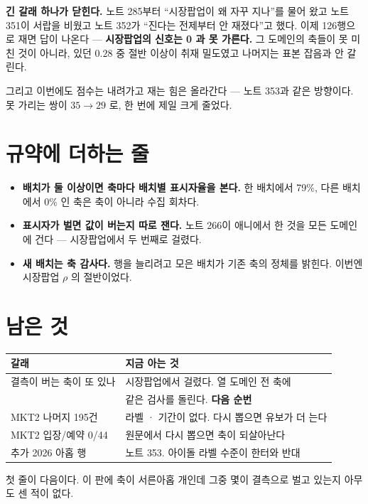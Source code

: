 \documentclass[11pt]{article}
\begin{document}
\textbf{긴 갈래 하나가 닫힌다.} 노트 285부터 ``시장팝업이 왜 자꾸 지나''를
물어 왔고 노트 351이 서랍을 비웠고 노트 352가 ``진다는 전제부터 안
재졌다''고 했다. 이제 126행으로 재면 답이 나온다 --- \textbf{시장팝업의
신호는 0 과 못 가른다.} 그 도메인의 축들이 못 미친 것이 아니라, 있던
$0.28$ 중 절반 이상이 취재 밀도였고 나머지는 표본 잡음과 안 갈린다.

그리고 이번에도 점수는 내려가고 재는 힘은 올라간다 --- 노트 353과 같은
방향이다. 못 가리는 쌍이 $35\to29$ 로, 한 번에 제일 크게 줄었다.

\section{규약에 더하는 줄}

\begin{itemize}
\item \textbf{배치가 둘 이상이면 축마다 배치별 표시자율을 본다.} 한
배치에서 79\%, 다른 배치에서 0\% 인 축은 축이 아니라 수집 회차다.
\item \textbf{표시자가 벌면 값이 버는지 따로 잰다.} 노트 266이 애니에서
한 것을 모든 도메인에 건다 --- 시장팝업에서 두 번째로 걸렸다.
\item \textbf{새 배치는 축 감사다.} 행을 늘리려고 모은 배치가 기존 축의
정체를 밝힌다. 이번엔 시장팝업 $\rho$ 의 절반이었다.
\end{itemize}

\section{남은 것}

\begin{center}
\begin{tabular}{ll}
\hline
갈래 & 지금 아는 것 \\
\hline
결측이 버는 축이 또 있나 & 시장팝업에서 걸렸다. 열 도메인 전 축에 \\
                        & 같은 검사를 돌린다. \textbf{다음 순번} \\
MKT2 나머지 195건 & 라벨 · 기간이 없다. 다시 뽑으면 유보가 더 는다 \\
MKT2 입장/예약 0/44 & 원문에서 다시 뽑으면 축이 되살아난다 \\
추가 2026 아홉 행 & 노트 353. 아이돌 라벨 수준이 한터와 반대 \\
\hline
\end{tabular}
\end{center}

첫 줄이 다음이다. 이 판에 축이 서른아홉 개인데 그중 몇이 결측으로 벌고
있는지 아무도 센 적이 없다.
\end{document}

